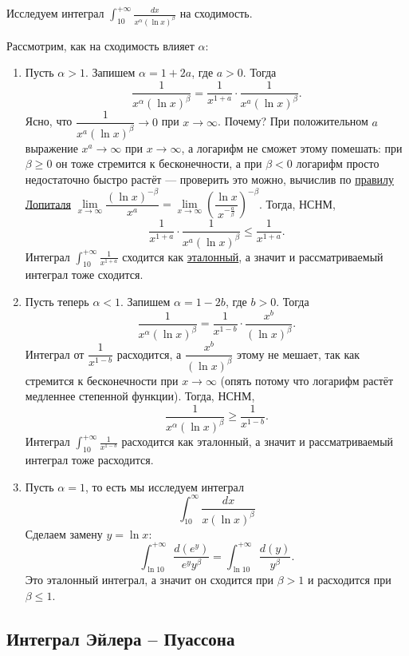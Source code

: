 \begin{example}
	Исследуем интеграл $\displaystyle \int_{10}^{+\infty} \frac{dx}{x^\alpha (\ln x)^\beta}$ на сходимость.
	
	Рассмотрим, как на сходимость влияет \(\alpha\):
	\begin{enumerate}
		\item Пусть \(\alpha > 1\). Запишем \(\alpha = 1 + 2a\), где \(a > 0\). Тогда \[
		\frac{1}{x^\alpha (\ln x)^\beta} = \frac{1}{x^{1+a}} \cdot \frac{1}{x^a (\ln x)^\beta}.
		\]
		Ясно, что \(\dfrac{1}{x^a (\ln x)^\beta} \to 0\) при \(x \to \infty\). Почему? При положительном \(a\) выражение \(x^a \to \infty\) при \(x \to \infty\), а логарифм не сможет этому помешать: при \(\beta \geqslant 0\) он тоже стремится к бесконечности, а при \(\beta < 0\) логарифм просто недостаточно быстро растёт --- проверить это можно, вычислив по \hyperlink{t3}{правилу Лопиталя} \(\lim\limits_{x \to \infty} \dfrac{(\ln x)^{-\beta}}{x^a} = \lim\limits_{x \to \infty} \left(\dfrac{\ln x}{x^{-\frac{a}{\beta}}} \right)^{-\beta}\).
		Тогда, НСНМ, \[
		\frac{1}{x^{1 + a}} \cdot \frac{1}{x^a (\ln x)^\beta} \leqslant 	\frac{1}{x^{1 + a}}.
		\]
		Интеграл \(\displaystyle \int_{10}^{+\infty} \frac{1}{x^{1 + a}}\) сходится как \hyperlink{etint}{эталонный}, а значит и рассматриваемый интеграл тоже сходится.
		\item Пусть теперь \(\alpha < 1\). Запишем \(\alpha = 1 - 2b\), где \(b > 0\). Тогда \[
		\frac{1}{x^\alpha (\ln x)^\beta} = \frac{1}{x^{1 - b}} \cdot \frac{x^b}{(\ln x)^\beta}.
		\]
		Интеграл от \(\dfrac{1}{x^{1 - b}}\) расходится, а \(\dfrac{x^b}{(\ln x)^\beta}\) этому не мешает, так как стремится к бесконечности при \(x \to \infty\) (опять потому что логарифм растёт медленнее степенной функции).
		Тогда, НСНМ, \[
		\frac{1}{x^\alpha (\ln x)^\beta} \geqslant \frac{1}{x^{1 - b}}.
		\]
		Интеграл \(\displaystyle \int_{10}^{+\infty} \frac{1}{x^{1 - b}}\) расходится как эталонный, а значит и рассматриваемый интеграл тоже расходится.
		\item Пусть \(\alpha = 1\), то есть мы исследуем интеграл \[
		\int_{10}^\infty \frac{dx}{x (\ln x)^\beta}
		\]
		Сделаем замену \(y = \ln x\): \[
		\int_{\ln 10}^{+\infty} \frac{d(e^y)}{e^y y^\beta} = \int_{\ln 10}^{+\infty} \frac{d(y)}{y^\beta}.
		\]
		Это эталонный интеграл, а значит он сходится при  \(\beta > 1\) и расходится при  \(\beta \leqslant 1\).
	\end{enumerate}
\end{example}

\subsection{Интеграл Эйлера -- Пуассона}

